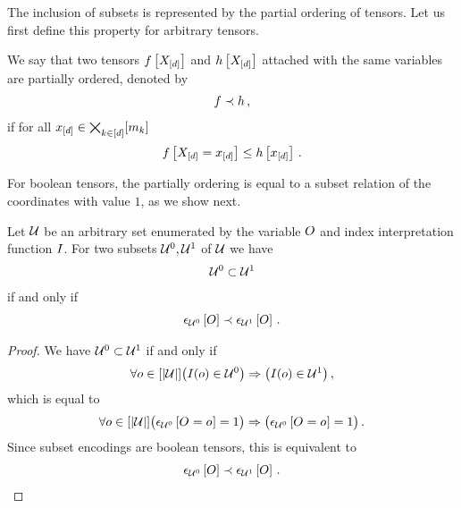 The inclusion of subsets is represented by the partial ordering of tensors.
Let us first define this property for arbitrary tensors.

\begin{definition}
    \label{def:partialOrder}
    We say that two tensors $f\left[X_{[d]}\right]$ and $h\left[X_{[d]}\right]$ attached with the same variables are partially ordered, denoted by
    \begin{align*}
    {f}
        \prec{h} \, ,
    \end{align*}
    if for all $x_{[d]}\in\bigtimes_{k\in[d]}[m_{k}]$
    \begin{align*}
        f\left[X_{[d]}=x_{[d]}\right] \leq h\left[x_{[d]}\right]  \, .
    \end{align*}
\end{definition}

For boolean tensors, the partially ordering is equal to a subset relation of the coordinates with value $1$, as we show next.

\begin{theorem}
    \label{the:subsetRelationSubsetEncoding}
    Let $\mathcal{U}$ be an arbitrary set enumerated by the variable $O$ and index interpretation function $I$.
    For two subsets $\mathcal{U}^{0},\mathcal{U}^{1}$ of $\mathcal{U}$ we have
    \begin{align*}
        \mathcal{U}^{0} \subset \mathcal{U}^{1}
    \end{align*}
    if and only if
    \begin{align*}
        \epsilon_{\mathcal{U}^{0}}\left[O\right] \prec \epsilon_{\mathcal{U}^{1}}\left[O\right] \, .
    \end{align*}
\end{theorem}
\begin{proof}
    We have $\mathcal{U}^{0} \subset \mathcal{U}^{1}$ if and only if
    \begin{align*}
        \forall{o\in[\left|\mathcal{U}\right|]} \big(I(o)\in\mathcal{U}^{0}\big) \Rightarrow \big(I(o)\in\mathcal{U}^{1}\big) \, ,
    \end{align*}
    which is equal to
    \begin{align*}
        \forall{o\in[\left|\mathcal{U}\right|]} \big(\epsilon_{\mathcal{U}^{0}}\left[O_{}=o_{}\right]=1\big) \Rightarrow \big(\epsilon_{\mathcal{U}^{0}}\left[O_{}=o_{}\right]=1\big)  \, .
    \end{align*}
    Since subset encodings are boolean tensors, this is equivalent to
    \begin{align*}
        \epsilon_{\mathcal{U}^{0}}\left[O\right] \prec \epsilon_{\mathcal{U}^{1}}\left[O\right] \, .
    \end{align*}
\end{proof}

